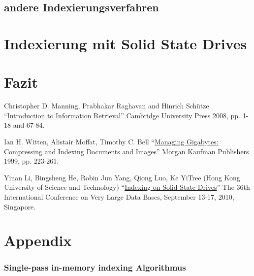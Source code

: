 \paragraph{}


\subsection{andere Indexierungsverfahren}



\section{Indexierung mit Solid State Drives} \label{indexSSD}

\section{Fazit}

\begin{thebibliography}{9}

		Christopher D. Manning, Prabhakar Raghavan and Hinrich Schütze \enquote{\href{https://nlp.stanford.edu/IR-book/pdf/04const.pdf}{Introduction to Information Retrieval}}  Cambridge University Press 2008, pp. 1-18 and 67-84.

	  Ian H. Witten, Alistair Moffat, Timothy C. Bell \enquote{\href{https://books.google.de/books?id=2F74jyPl48EC&dq=Witten+et+al.+index+1999&lr=&hl=de&source=gbs_navlinks_s}{Managing Gigabytes: Compressing and Indexing Documents and Images}}  Morgan Kaufman Publishers 1999, pp. 223-261.
	
	Yinan Li, Bingsheng He, Robin Jun Yang, Qiong Luo, Ke YiTree (Hong Kong University of Science and Technology) \enquote{\href{http://pages.cs.wisc.edu/~yinan/paper/fdtree_pvldb.pdf}{Indexing on Solid State Drives}} The 36th International Conference on Very Large Data Bases, September 13-17,
2010, Singapore.
\end{thebibliography}

\newpage

\section*{Appendix}
\subsubsection*{Single-pass in-memory indexing Algorithmus}

